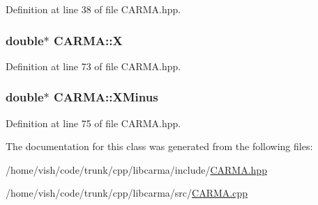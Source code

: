 Definition at line 38 of file C\-A\-R\-M\-A.\-hpp.

\hypertarget{class_c_a_r_m_a_ad57c7f2816413aa6b7e98b147ad73712}{
\subsubsection[{X}]{\setlength{\rightskip}{0pt plus 5cm}double$\ast$ C\-A\-R\-M\-A\-::\-X}}\label{class_c_a_r_m_a_ad57c7f2816413aa6b7e98b147ad73712}


Definition at line 73 of file C\-A\-R\-M\-A.\-hpp.

\hypertarget{class_c_a_r_m_a_a4f2333fe508efc7d8e59776aa98fdd50}{
\subsubsection[{X\-Minus}]{\setlength{\rightskip}{0pt plus 5cm}double$\ast$ C\-A\-R\-M\-A\-::\-X\-Minus}}\label{class_c_a_r_m_a_a4f2333fe508efc7d8e59776aa98fdd50}


Definition at line 75 of file C\-A\-R\-M\-A.\-hpp.



The documentation for this class was generated from the following files\-:\begin{DoxyCompactItemize}
\item 
/home/vish/code/trunk/cpp/libcarma/include/\hyperlink{_c_a_r_m_a_8hpp}{C\-A\-R\-M\-A.\-hpp}\item 
/home/vish/code/trunk/cpp/libcarma/src/\hyperlink{_c_a_r_m_a_8cpp}{C\-A\-R\-M\-A.\-cpp}\end{DoxyCompactItemize}
